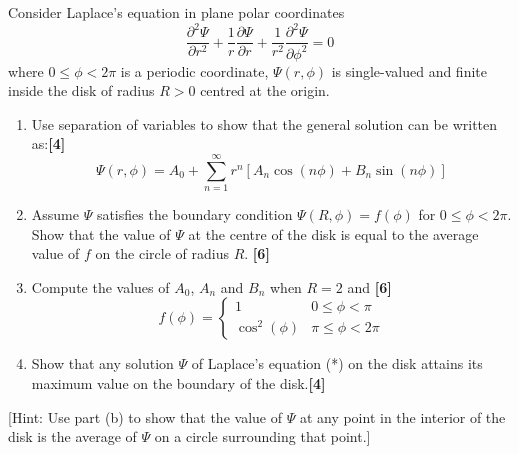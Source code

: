 \documentclass[a4paper]{article}
\begin{document}
\begin{qns}
Consider Laplace’s equation in plane polar coordinates
\begin{equation}
    \frac{\partial^2\Psi}{\partial r^2}+\frac{1}{r}\frac{\partial\Psi}{\partial r}+\frac{1}{r^2}\frac{\partial^2\Psi}{\partial\phi^2}=0\tag{*}
    \end{equation}
where $0\leq\phi<2\pi$ is a periodic coordinate, $\Psi(r,\phi)$ is single-valued and finite inside the disk of radius $R > 0$ centred at the origin.
\begin{enumerate}[label=(\alph*)]
\item Use separation of variables to show that the general solution can be written as:\hfill\textbf{[4]}
$$\Psi(r,\phi)=A_0+\sum_{n=1}^\infty r^n[A_n\cos(n\phi)+B_n\sin(n\phi)]$$
\item Assume $\Psi$ satisfies the boundary condition $\Psi(R, \phi) = f(\phi)$ for $0\leq\phi<2\pi$. Show that the value of $\Psi$ at the centre of the disk is equal to the average value of $f$ on the circle of radius $R$. \hfill\textbf{[6]}
\item Compute the values of $A_0$, $A_n$ and $B_n$ when $R = 2$ and \hfill\textbf{[6]}
$$f(\phi)=
\left\{
        \begin{array}{ll}
      1 & 0\leq\phi<\pi \\
      \cos^2(\phi) & \pi\leq\phi<2\pi 
        \end{array}
    \right.$$
\item Show that any solution $\Psi$ of Laplace’s equation (*) on the disk attains its maximum value on the boundary of the disk.\hfill\textbf{[4]}
\end{enumerate}
[Hint: Use part (b) to show that the value of $\Psi$ at any point in the interior of the disk is the average of $\Psi$ on a circle surrounding that point.]
\end{qns}
\end{document}
